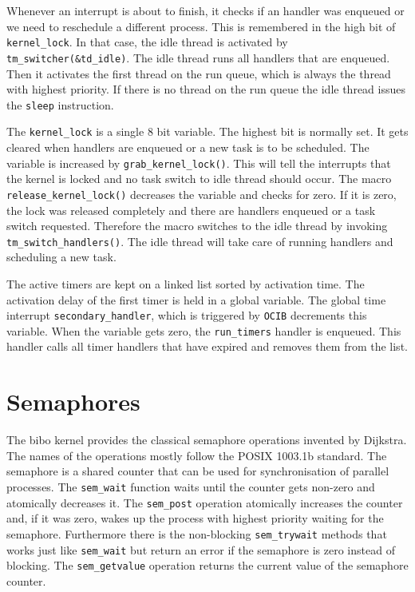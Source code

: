 \documentclass[twocolumn]{article}
\begin{document}
  Whenever an interrupt is about to finish, it checks if an handler was
  enqueued or we need to reschedule a different process.  This is remembered
  in the high bit of \verb|kernel_lock|.  In that case, the idle thread is
  activated by \verb|tm_switcher(&td_idle)|.  The idle thread runs all
  handlers that are enqueued.  Then it activates the first thread on the run
  queue, which is always the thread with highest priority.  If there is no
  thread on the run queue the idle thread issues the \verb|sleep| instruction.

  The \verb|kernel_lock| is a single 8 bit variable.  The highest bit is
  normally set.  It gets cleared when handlers are enqueued or a new task is
  to be scheduled.  The variable is increased by \verb|grab_kernel_lock()|.
  This will tell the interrupts that the kernel is locked and no task switch
  to idle thread should occur.  The macro \verb|release_kernel_lock()|
  decreases the variable and checks for zero.  If it is zero, the lock was
  released completely and there are handlers enqueued or a task switch
  requested.  Therefore the macro switches to the idle thread by invoking
  \verb|tm_switch_handlers()|.  The idle thread will take care of running
  handlers and scheduling a new task.

  The active timers are kept on a linked list sorted by activation time.  The
  activation delay of the first timer is held in a global variable.  The
  global time interrupt \verb|secondary_handler|, which is triggered by
  \verb|OCIB| decrements this variable.  When the variable gets zero, the
  \verb|run_timers| handler is enqueued.  This handler calls all timer
  handlers that have expired and removes them from the list.

  \section{Semaphores}
  The bibo kernel provides the classical semaphore operations invented by
  Dijkstra.  The names of the operations mostly follow the POSIX 1003.1b
  standard.  The semaphore is a shared counter that can be used for
  synchronisation of parallel processes.  The \verb|sem_wait| function waits
  until the counter gets non-zero and atomically decreases it.  The
  \verb|sem_post| operation atomically increases the counter and, if it was
  zero, wakes up the process with highest priority waiting for the semaphore.
  Furthermore there is the non-blocking \verb|sem_trywait| methods that works
  just like \verb|sem_wait| but return an error if the semaphore is zero
  instead of blocking.  The \verb|sem_getvalue| operation returns the current
  value of the semaphore counter.
\end{document}
